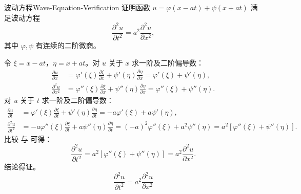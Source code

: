 \begin{problem}{波动方程}{Wave-Equation-Verification}
    证明函数 $u = \varphi(x - at) + \psi(x + at)$ 满足波动方程
    \begin{equation}
        \frac{\partial^2 u}{\partial t^2} = a^2 \frac{\partial^2 u}{\partial x^2},
    \end{equation}
    其中 $\varphi, \psi$ 有连续的二阶微商。
\end{problem}

\begin{myproof}
    令 $\xi = x - at$，$\eta = x + at$。对 $u$ 关于 $x$ 求一阶及二阶偏导数：
    \begin{equation} \label{eq:u-xx}
        \begin{aligned}
            \frac{\partial u}{\partial x}     & = \varphi'(\xi) \frac{\partial \xi}{\partial x} + \psi'(\eta) \frac{\partial \eta}{\partial x} = \varphi'(\xi) + \psi'(\eta),     \\
            \frac{\partial^2 u}{\partial x^2} & = \varphi''(\xi) \frac{\partial \xi}{\partial x} + \psi''(\eta) \frac{\partial \eta}{\partial x} = \varphi''(\xi) + \psi''(\eta).
        \end{aligned}
    \end{equation}
    对 $u$ 关于 $t$ 求一阶及二阶偏导数：
    \begin{equation} \label{eq:u-tt}
        \begin{aligned}
            \frac{\partial u}{\partial t}     & = \varphi'(\xi) \frac{\partial \xi}{\partial t} + \psi'(\eta) \frac{\partial \eta}{\partial t} = -a \varphi'(\xi) + a \psi'(\eta),                                                                   \\
            \frac{\partial^2 u}{\partial t^2} & = -a \varphi''(\xi) \frac{\partial \xi}{\partial t} + a \psi''(\eta) \frac{\partial \eta}{\partial t} = (-a)^2 \varphi''(\xi) + a^2 \psi''(\eta) = a^2 \left[ \varphi''(\xi) + \psi''(\eta) \right].
        \end{aligned}
    \end{equation}
    比较  与  可得：
    \begin{equation}
        \frac{\partial^2 u}{\partial t^2} = a^2 \left[ \varphi''(\xi) + \psi''(\eta) \right] = a^2 \frac{\partial^2 u}{\partial x^2}.
    \end{equation}
    结论得证。
    \begin{equation}
        \boxed{\frac{\partial^2 u}{\partial t^2} = a^2 \frac{\partial^2 u}{\partial x^2}}
    \end{equation}
\end{myproof}


